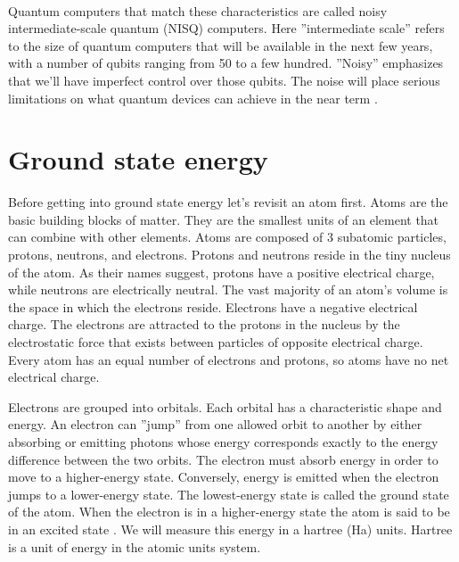 \paragraph{}
Quantum computers that match these characteristics are called noisy intermediate-scale quantum (NISQ) computers. Here ''intermediate scale'' refers to the size of quantum computers that will be available in the next few years, with a number of qubits ranging from 50 to a few hundred. ''Noisy'' emphasizes that we'll have imperfect control over those qubits. The noise will place serious limitations on what quantum devices can achieve in the near term \cite{preskill_nisq}.


\section{Ground state energy}
Before getting into ground state energy let's revisit an atom first. Atoms are the basic building blocks of matter. They are the smallest units of an element that can combine with other elements. Atoms are composed of 3 subatomic particles, protons, neutrons, and electrons. Protons and neutrons reside in the tiny nucleus of the atom. As their names suggest, protons have a positive electrical charge, while neutrons are electrically neutral. The vast majority of an atom's volume is the space in which the electrons reside. Electrons have a negative electrical charge. The electrons are attracted to the protons in the nucleus by the electrostatic force that exists between particles of opposite electrical charge. Every atom has an equal number of electrons and protons, so atoms have no net electrical charge.

Electrons are grouped into orbitals. Each orbital has a characteristic shape and energy. An electron can ''jump'' from one allowed orbit to another by either absorbing or emitting photons whose energy corresponds exactly to the energy difference between the two orbits. The electron must absorb energy in order to move to a higher-energy state. Conversely, energy is emitted when the electron jumps to a lower-energy state. The lowest-energy state is called the ground state of the atom. When the electron is in a higher-energy state the atom is said to be in an excited state \cite{chemistry}. We will measure this energy in a hartree (Ha) units. Hartree is a unit of energy in the atomic units system.~\cite{hartree}

